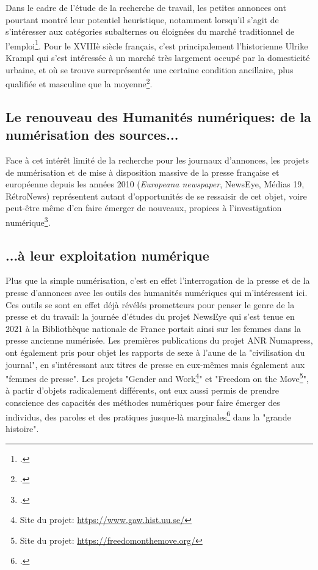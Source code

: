 Dans le cadre de l'étude de la recherche de travail, les petites annonces ont pourtant montré leur potentiel heuristique, notamment lorsqu'il s'agit de s'intéresser aux catégories subalternes ou éloignées du marché traditionnel de l'emploi\footcites{bresseyLookingWorkBlack2010}{alvesRosieRiveterJob2012}. Pour le XVIIIè siècle français, c'est principalement l'historienne Ulrike Krampl qui s'est intéressée à un marché très largement occupé par la domesticité urbaine, et où se trouve surreprésentée une certaine condition ancillaire, plus qualifiée et masculine que la moyenne\footcites{kramplPresseAnnoncesParisienne2020,kramplTravaillerAvecLangues2019}. 

\subsection{Le renouveau des Humanités numériques: de la numérisation des sources...}

Face à cet intérêt limité de la recherche pour les journaux d'annonces, les projets de numérisation et de mise à disposition massive de la presse française et européenne depuis les années 2010 (\textit{Europeana newspaper}, NewsEye, Médias 19, RétroNews) représentent autant d'opportunités de se ressaisir de cet objet, voire peut-être même d'en faire émerger de nouveaux, propices à l'investigation numérique\footcites{pinsonLirePresseXIXe2017}. 


\subsection{...à leur exploitation numérique}

Plus que la simple numérisation, c'est en effet l'interrogation de la presse et de la presse d'annonces avec les outils des humanités numériques qui m'intéressent ici. Ces outils se sont en effet déjà révélés prometteurs pour penser le genre de la presse et du travail: la journée d'études du projet NewsEye qui s'est tenue en 2021 à la Bibliothèque nationale de France portait ainsi sur les femmes dans la presse ancienne numérisée. Les premières publications du projet ANR Numapress, ont également pris pour objet les rapports de sexe à l'aune de la "civilisation du journal", en s'intéressant aux titres de presse en eux-mêmes mais également aux "femmes de presse". Les projets "Gender and Work\footnote{Site du projet: \url{https://www.gaw.hist.uu.se/}}" et "Freedom on the Move\footnote{Site du projet: \url{https://freedomonthemove.org/}}", à partir d'objets radicalement différents, ont eux aussi permis de prendre conscience des capacités des méthodes numériques pour faire émerger des individus, des paroles et des pratiques jusque-là marginales\footcites{laiteEmmetInchSmall2020} dans la "grande histoire". 


